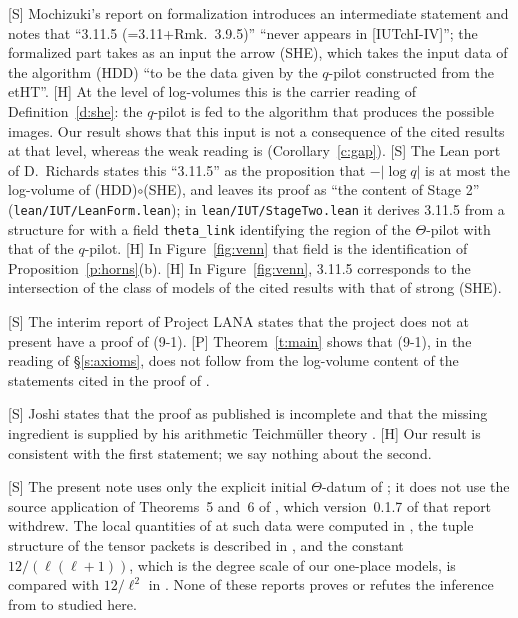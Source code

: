 \documentclass[11pt]{article}
\theoremstyle{plain}
\theoremstyle{definition}
\theoremstyle{remark}
\newcommand{\Smark}{\textup{[S]}}
\newcommand{\Pmark}{\textup{[P]}}
\newcommand{\Hmark}{\textup{[H]}}
\begin{document}
\Smark{} Mochizuki's report on formalization \cite[\S4]{Form} introduces an intermediate
statement and notes that ``3.11.5 (=3.11+Rmk.\ 3.9.5)'' ``never appears in
[IUTchI-IV]''; the formalized part takes as an input the arrow (SHE), which takes the
input data of the algorithm (HDD) ``to be the data given by the $q$-pilot constructed from
the etHT''. \Hmark{} At the level of log-volumes this is the carrier reading of
Definition~\ref{d:she}: the $q$-pilot is fed to the algorithm that produces the possible
images. Our result shows that this input is not a consequence of the cited results at that
level, whereas the weak reading is (Corollary~\ref{c:gap}). \Smark{} The Lean port of
D.~Richards \cite{Ri} states this ``3.11.5'' as the proposition that $-|\log q|$ is at most
the log-volume of (HDD)$\circ$(SHE), and leaves its proof as ``the content of Stage 2''
(\texttt{lean/IUT/LeanForm.lean}); in \texttt{lean/IUT/StageTwo.lean} it derives 3.11.5 from
a structure for \cite[Thm.~3.11]{IUT3} with a field \texttt{theta\_link} identifying the
region of the $\Theta$-pilot with that of the $q$-pilot. \Hmark{} In
Figure~\ref{fig:venn} that field is the identification of Proposition~\ref{p:horns}(b).
\Hmark{} In Figure~\ref{fig:venn}, 3.11.5 corresponds to the intersection of the class of
models of the cited results with that of strong (SHE).

\Smark{} The interim report of Project LANA \cite[\S10.5]{LANA} states that the project
does not at present have a proof of (9-1). \Pmark{} Theorem~\ref{t:main} shows that (9-1),
in the reading of \S\ref{s:axioms}, does not follow from the log-volume content of the
statements cited in the proof of \cite[Cor.~3.12]{IUT3}.

\Smark{} Joshi \cite{JoshiLANA} states that the proof as published is incomplete and that
the missing ingredient is supplied by his arithmetic Teichm\"uller theory
\cite{JoshiIII,JoshiIV}. \Hmark{} Our result is consistent with the first statement; we
say nothing about the second.

\Smark{} The present note uses only the explicit initial $\Theta$-datum of
\cite[Thm.~1]{First}; it does not use the source application of Theorems~5 and~6 of
\cite{First}, which version~0.1.7 of that report withdrew. The
local quantities of \cite{IUT4} at such data were computed in \cite{Second,Third}, the
tuple structure of the tensor packets is described in \cite{Fourth}, and the constant
$12/(\ell(\ell+1))$, which is the degree scale of our one-place models, is compared with
$12/\ell^2$
in \cite{Fifth}. None of these reports proves or refutes the inference from
\cite[Thm.~3.11]{IUT3} to \cite[Cor.~3.12]{IUT3} studied here.
\end{document}
